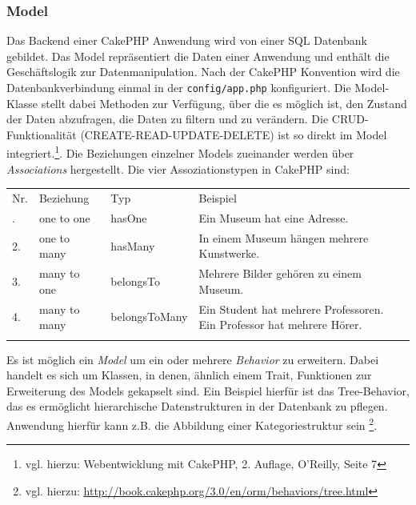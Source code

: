 	\subsubsection{Model}
	
	Das Backend einer CakePHP Anwendung wird von einer SQL Datenbank gebildet. Das Model repräsentiert die Daten einer Anwendung und enthält die Geschäftslogik zur Datenmanipulation. Nach der CakePHP Konvention wird die Datenbankverbindung einmal in der \texttt{config/app.php} konfiguriert. Die Model-Klasse stellt dabei Methoden zur Verfügung, über die es möglich ist, den Zustand der Daten abzufragen, die Daten zu filtern und zu verändern. Die CRUD-Funktionalität (CREATE-READ-UPDATE-DELETE) ist so direkt im Model integriert.\footnote{vgl. hierzu: Webentwicklung mit CakePHP, 2. Auflage, O'Reilly, Seite 7}. 
	Die Beziehungen einzelner Models zueinander werden über \textit{Associations} hergestellt. Die vier Assoziationstypen in CakePHP sind:\\

	\begin{table}[!htbp]
		\begin{tabularx}{\textwidth}{p{1cm} X X p{8cm}}
			\cline{2-4}
			\rowcolor[HTML]{EFEFEF} 
			 Nr. & Beziehung & Typ & Beispiel \\ \cline{1-4} \addlinespace
			1. & one to one & hasOne & Ein Museum hat eine Adresse. \\
			2. & one to many & hasMany & In einem Museum hängen mehrere Kunstwerke. \\
			3. & many to one & belongsTo & Mehrere Bilder gehören zu einem Museum. \\  
			4. & many to many & belongsToMany & Ein Student hat mehrere Professoren. Ein Professor hat mehrere Hörer. \\ \addlinespace \cline{1-4}     
		\end{tabularx}
	\end{table}
		
	
	
	
	Es ist möglich ein \textit{Model} um ein oder mehrere \textit{Behavior} zu erweitern. Dabei handelt es sich um Klassen, in denen, ähnlich einem Trait, Funktionen zur Erweiterung des Models gekapselt sind. Ein Beispiel hierfür ist das Tree-Behavior, das es ermöglicht hierarchische Datenstrukturen in der Datenbank zu pflegen. Anwendung hierfür kann z.B. die Abbildung einer Kategoriestruktur sein \footnote{vgl. hierzu: \url{http://book.cakephp.org/3.0/en/orm/behaviors/tree.html}}.
	
